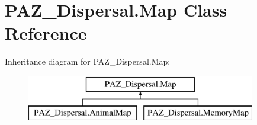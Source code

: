 \hypertarget{class_p_a_z___dispersal_1_1_map}{\section{P\-A\-Z\-\_\-\-Dispersal.\-Map Class Reference}
\label{class_p_a_z___dispersal_1_1_map}
}
Inheritance diagram for P\-A\-Z\-\_\-\-Dispersal.\-Map\-:\begin{figure}[H]
\begin{center}
\leavevmode
\includegraphics[height=2.000000cm]{class_p_a_z___dispersal_1_1_map}
\end{center}
\end{figure}
